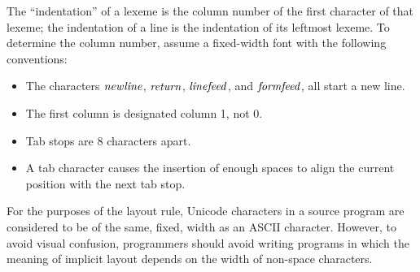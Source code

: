 The ``indentation'' of a lexeme is the column number
of the first character of that lexeme; the indentation of a line is the
indentation of its leftmost lexeme.  To determine the column number,
assume a fixed-width font with the following conventions:
\begin{itemize}
\item The characters \mbox{$\it newline$}, \mbox{$\it return$}, \mbox{$\it linefeed$}, and \mbox{$\it formfeed$}, all start a new line.
\item The first column is designated column 1, not 0.
\item Tab stops are 8 characters apart.
\item A tab character causes the insertion of
enough spaces to align the current position with the next tab stop.
\end{itemize}
For the purposes of the layout rule, Unicode characters in a source program
are considered to be of the same, fixed, width as an ASCII character.
However, to avoid visual confusion, programmers should avoid writing programs in which 
the meaning of implicit layout depends on the width of non-space characters.

